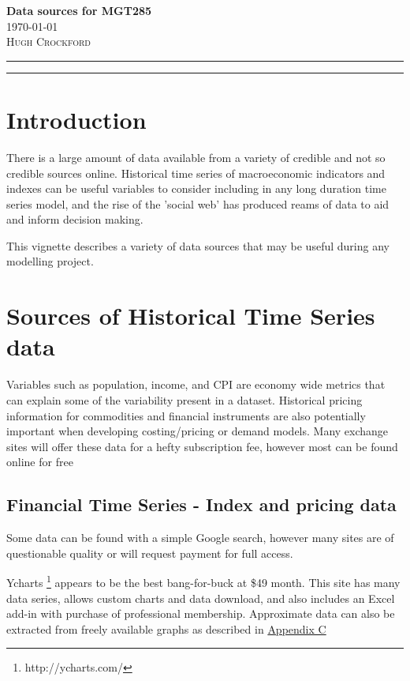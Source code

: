 \documentclass[11pt]{article}
\begin{document}
\begin{flushleft}
	\vspace*{0.3in}
	\Huge \textbf{Data sources for MGT285}\\
	\Large \today \\
	\vspace{0.25in}
	\textsc{Hugh Crockford}
	\vspace{0.25in}
	\hrule
	\hrule
	\tableofcontents
\end{flushleft}

	\vspace{0.75in}

\newpage
\section{Introduction}
	There is a large amount of data available from a variety of credible and not so credible sources online.
	Historical time series of macroeconomic indicators and indexes can be useful variables to consider including in any long duration time series model, and the rise of the 'social web' has produced reams of data to aid and inform decision making.


	This vignette describes a variety of data sources that may be useful during any modelling project.

\section{Sources of Historical Time Series data}
	Variables such as population, income, and CPI are economy wide metrics that can explain some of the variability present in a dataset.
	Historical pricing information for commodities and financial instruments are also potentially important when developing costing/pricing or demand models.
	Many exchange sites will offer these data for a hefty subscription fee, however most can be found online for free

	\subsection{Financial Time Series - Index and pricing data}
	Some data can be found with a simple Google search, however many sites are of questionable quality or will request payment for full access.


	Ycharts \footnote{http://ycharts.com/} appears to be the best bang-for-buck at \$49 month. 
	This site has many data series, allows custom charts and data download, and also includes an Excel add-in with purchase of professional membership.
	Approximate data can also be extracted from freely available graphs as described in \hyperref[graph]{Appendix C}
\end{document}
